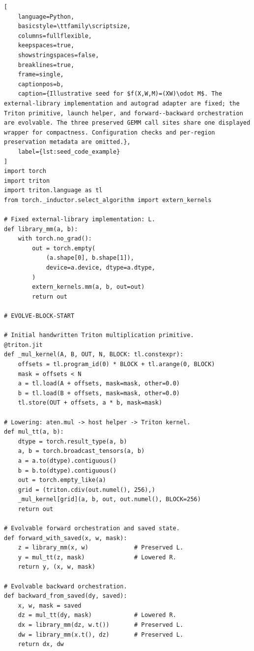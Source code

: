 \begin{lstlisting}[
    language=Python,
    basicstyle=\ttfamily\scriptsize,
    columns=fullflexible,
    keepspaces=true,
    showstringspaces=false,
    breaklines=true,
    frame=single,
    captionpos=b,
    caption={Illustrative seed for $f(X,W,M)=(XW)\odot M$. The external-library implementation and autograd adapter are fixed; the Triton primitive, launch helper, and forward--backward orchestration are evolvable. The three preserved GEMM call sites share one displayed wrapper for compactness. Configuration checks and per-region preservation metadata are omitted.},
    label={lst:seed_code_example}
]
import torch
import triton
import triton.language as tl
from torch._inductor.select_algorithm import extern_kernels

# Fixed external-library implementation: L.
def library_mm(a, b):
    with torch.no_grad():
        out = torch.empty(
            (a.shape[0], b.shape[1]),
            device=a.device, dtype=a.dtype,
        )
        extern_kernels.mm(a, b, out=out)
        return out

# EVOLVE-BLOCK-START

# Initial handwritten Triton multiplication primitive.
@triton.jit
def _mul_kernel(A, B, OUT, N, BLOCK: tl.constexpr):
    offsets = tl.program_id(0) * BLOCK + tl.arange(0, BLOCK)
    mask = offsets < N
    a = tl.load(A + offsets, mask=mask, other=0.0)
    b = tl.load(B + offsets, mask=mask, other=0.0)
    tl.store(OUT + offsets, a * b, mask=mask)

# Lowering: aten.mul -> host helper -> Triton kernel.
def mul_tt(a, b):
    dtype = torch.result_type(a, b)
    a, b = torch.broadcast_tensors(a, b)
    a = a.to(dtype).contiguous()
    b = b.to(dtype).contiguous()
    out = torch.empty_like(a)
    grid = (triton.cdiv(out.numel(), 256),)
    _mul_kernel[grid](a, b, out, out.numel(), BLOCK=256)
    return out

# Evolvable forward orchestration and saved state.
def forward_with_saved(x, w, mask):
    z = library_mm(x, w)             # Preserved L.
    y = mul_tt(z, mask)              # Lowered R.
    return y, (x, w, mask)

# Evolvable backward orchestration.
def backward_from_saved(dy, saved):
    x, w, mask = saved
    dz = mul_tt(dy, mask)            # Lowered R.
    dx = library_mm(dz, w.t())       # Preserved L.
    dw = library_mm(x.t(), dz)       # Preserved L.
    return dx, dw


\end{lstlisting}

